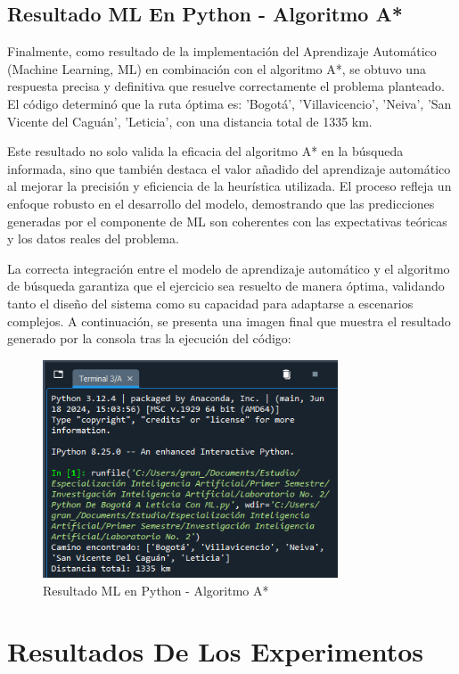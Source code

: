 \documentclass[conference]{IEEEtran}
\begin{document}
\begin{itemize}
	\subsection{Resultado ML En Python - Algoritmo A*}
	Finalmente, como resultado de la implementación del Aprendizaje Automático (Machine Learning, ML) en combinación con el algoritmo A*, se obtuvo una respuesta precisa y definitiva que resuelve correctamente el problema planteado. El código determinó que la ruta óptima es: 'Bogotá', 'Villavicencio', 'Neiva', 'San Vicente del Caguán', 'Leticia', con una distancia total de 1335 km.
	
	Este resultado no solo valida la eficacia del algoritmo A* en la búsqueda informada, sino que también destaca el valor añadido del aprendizaje automático al mejorar la precisión y eficiencia de la heurística utilizada. El proceso refleja un enfoque robusto en el desarrollo del modelo, demostrando que las predicciones generadas por el componente de ML son coherentes con las expectativas teóricas y los datos reales del problema.
	
	La correcta integración entre el modelo de aprendizaje automático y el algoritmo de búsqueda garantiza que el ejercicio sea resuelto de manera óptima, validando tanto el diseño del sistema como su capacidad para adaptarse a escenarios complejos. A continuación, se presenta una imagen final que muestra el resultado generado por la consola tras la ejecución del código:
		\begin{figure}[ht!] %
			\centering
			\includegraphics[width=3.45in]{Imagen40.png}
			\caption{Resultado ML en Python - Algoritmo A*}
			\label{picture}
		\end{figure}
	\end{itemize}
	\section{Resultados De Los Experimentos}
	
\end{document}
